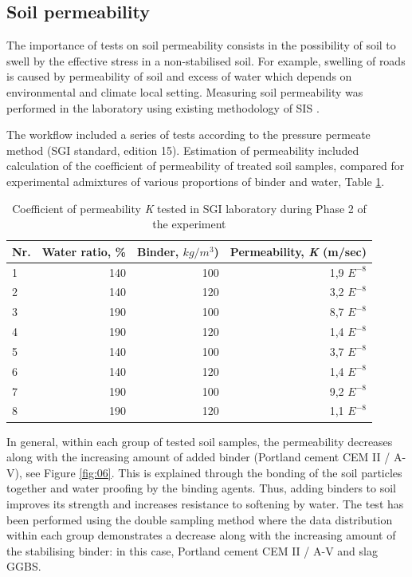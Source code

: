\documentclass{amestyle}
\begin{document}
\subsection{Soil permeability}
The importance of tests on soil permeability consists in the possibility of soil to swell by the effective stress in a non-stabilised soil. For example, swelling of roads is caused by permeability of soil and excess of water which depends on environmental and climate local setting. Measuring soil permeability was performed in the laboratory using existing methodology of SIS \cite{SIS2019}. 

The workflow included a series of tests according to the pressure permeate method (SGI standard, edition 15). Estimation of permeability included calculation of the coefficient of permeability of treated soil samples, compared for experimental admixtures of various proportions of binder and water, Table \ref{tab:1}.

\begin{table}[htbp]
  \caption{Coefficient of permeability \emph{K} tested in SGI laboratory during Phase 2 of the experiment}
  \label{tab:1}
  \centering
  \begin{tabular}{| l | r | r | r |}
    \hline
    \multicolumn{1}{|c|}{Nr.} &
    \multicolumn{1}{|c|}{Water ratio, \%} &
    \multicolumn{1}{|c|}{Binder, $kg/m^3$)} &
    \multicolumn{1}{|c|}{Permeability, \emph{K} (m/sec) } \\\hline
    1 & 140 & 100 & 1,9 $E^{-8}$ \\
    2 & 140 & 120 & 3,2 $E^{-8}$ \\
    3 & 190 & 100 & 8,7 $E^{-8}$ \\
    4 & 190 & 120 & 1,4 $E^{-8}$ \\
    5 & 140 & 100 & 3,7 $E^{-8}$ \\
    6 & 140 & 120 & 1,4 $E^{-8}$ \\
    7 & 190 & 100 & 9,2 $E^{-8}$ \\
    8 & 190 & 120 & 1,1 $E^{-8}$ \\\hline
  \end{tabular}
\end{table}

In general, within each group of tested soil samples, the permeability decreases along with the increasing amount of added binder (Portland cement CEM II / A-V), see Figure \ref{fig:06}. This is explained through the bonding of the soil particles together and water proofing by the binding agents. Thus, adding binders to soil improves its strength and increases resistance to softening by water. The test has been performed using the double sampling method where the data distribution within each group demonstrates a decrease along with the increasing amount of the stabilising binder: in this case, Portland cement CEM II / A-V and slag GGBS. 
\end{document}
